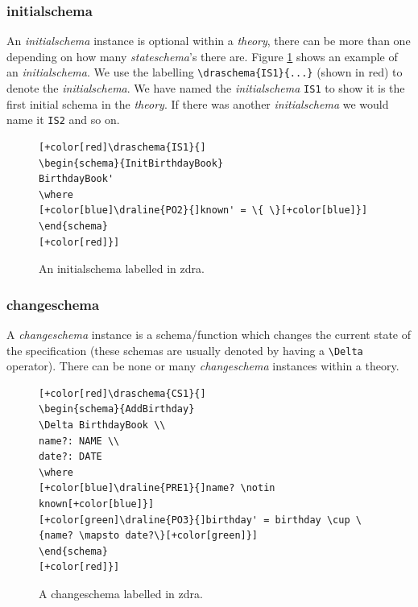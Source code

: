 \subsubsection{initialschema}

An \emph{initialschema} instance is optional within a \emph{theory}, there can be more than one depending on how many \emph{stateschema}'s there are. Figure \ref{fig:exampleofis} shows an example of an \emph{initialschema}. We use the labelling \verb|\draschema{IS1}{...}| (shown in red) to denote the \emph{initialschema}. We have named the \emph{initialschema} \verb|IS1| to show it is the first initial schema in the \emph{theory}. If there was another \emph{initialschema} we would name it \verb|IS2| and so on.

\begin{figure}[H]
\centering
\begin{footnotesize}
\begin{BVerbatim}[commandchars=+\[\]]
[+color[red]\draschema{IS1}{]
\begin{schema}{InitBirthdayBook} 
BirthdayBook' 
\where 
[+color[blue]\draline{PO2}{]known' = \{ \}[+color[blue]}]
\end{schema}
[+color[red]}]
\end{BVerbatim}
\caption{\label{fig:exampleofis} An initialschema labelled in \gls{zdra}.}
\end{footnotesize}
\end{figure}

\subsubsection{changeschema}

A \emph{changeschema} instance is a schema/function which changes the current state of the specification (these schemas are usually denoted by having a \verb|\Delta| operator). There can be none or many \emph{changeschema} instances within a theory.

\begin{center}
\begin{figure}[H]
\centering
\begin{footnotesize}
\begin{BVerbatim}[commandchars=+\[\]]
[+color[red]\draschema{CS1}{]
\begin{schema}{AddBirthday}
\Delta BirthdayBook \\
name?: NAME \\
date?: DATE
\where
[+color[blue]\draline{PRE1}{]name? \notin known[+color[blue]}]
[+color[green]\draline{PO3}{]birthday' = birthday \cup \{name? \mapsto date?\}[+color[green]}]
\end{schema}
[+color[red]}]
\end{BVerbatim}
\end{footnotesize}
\caption{\label{fig:exampleofcs} A changeschema labelled in \gls{zdra}.}
\end{figure}
\end{center}

